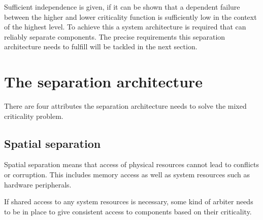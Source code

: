 Sufficient independence is given, if it can be shown that a dependent failure between the higher and lower criticality function is sufficiently low in the context of the highest level.
To achieve this a system architecture is required that can reliably separate components. The precise requirements this separation architecture needs to fulfill will be tackled in the next section.


\section{The separation architecture} \label{separation-arch}
There are four attributes the separation architecture needs to solve the mixed criticality problem.
\subsection{Spatial separation}

Spatial separation means that access of physical resources cannot lead to conflicts or corruption. This includes memory access as well as system resources such as hardware peripherals. \cite{Wittenstein.spatial.2017}\cite{perez2013safety}

If shared access to any system resources is necessary, some kind of arbiter needs to be in place to give consistent access to components based on their criticality. 
